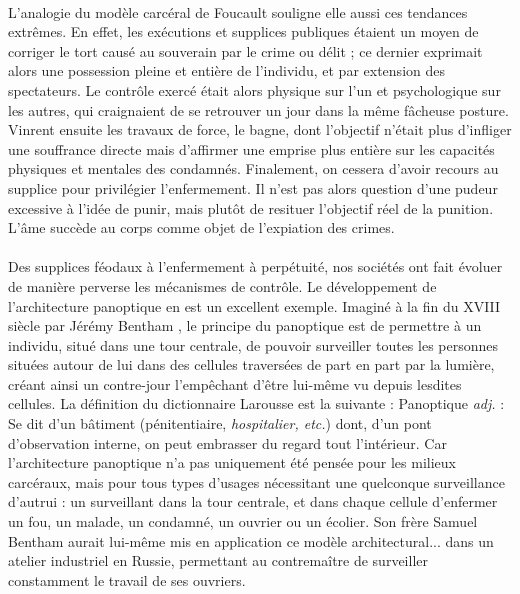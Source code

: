 \paragraph{} L'analogie du modèle carcéral de Foucault souligne elle aussi ces tendances extrêmes.
En effet, les exécutions et supplices publiques étaient un moyen de corriger le tort causé au souverain par le crime ou
délit ; ce dernier exprimait alors une possession pleine et entière de l'individu, et par extension des spectateurs. 
Le contrôle exercé était alors physique sur l'un et psychologique sur les autres, qui craignaient de se retrouver un jour
dans la même fâcheuse posture. Vinrent ensuite les travaux de force, le bagne, dont l'objectif n'était plus d'infliger
une souffrance directe mais d'affirmer une emprise plus entière sur les capacités physiques et mentales des condamnés.
Finalement, on cessera d'avoir recours au supplice pour privilégier l'enfermement. Il n'est pas alors question d'une
pudeur excessive à l'idée de punir, mais plutôt de resituer l'objectif réel de la punition.
\guillemotleft L'âme succède au corps comme objet de l'expiation des crimes. \guillemotright \cite{Foucault0}

\paragraph{} Des supplices féodaux à l'enfermement à perpétuité, nos sociétés ont fait évoluer de manière perverse les
mécanismes de contrôle. Le développement de l'architecture panoptique en est un excellent exemple. Imaginé à la fin du
XVIII siècle par Jérémy Bentham \cite{Panoptique1}, le principe du panoptique est de permettre à un individu,
situé dans une tour centrale, de pouvoir surveiller toutes les personnes situées autour de lui dans des cellules traversées
de part en part par la lumière, créant ainsi un contre-jour l'empêchant d'être lui-même vu depuis lesdites cellules.
La définition du dictionnaire Larousse est la suivante : \guillemotleft Panoptique \emph{adj.} : Se dit d'un bâtiment (pénitentiaire,
\emph{hospitalier, etc.}) dont, d'un pont d'observation interne, on peut embrasser du regard tout l'intérieur. \guillemotright
\cite{Panoptique0} Car l'architecture panoptique n'a pas uniquement été pensée pour les milieux carcéraux, mais pour tous
types d'usages nécessitant une quelconque surveillance d'autrui : \guillemotleft [...] un surveillant dans la
tour centrale, et dans chaque cellule d'enfermer un fou, un malade, un condamné, un ouvrier ou un écolier. \guillemotright
\cite{Panoptique2} Son frère Samuel Bentham aurait lui-même mis en application ce modèle architectural... dans un atelier
industriel en Russie, permettant au contremaître de surveiller constamment le travail de ses ouvriers.

